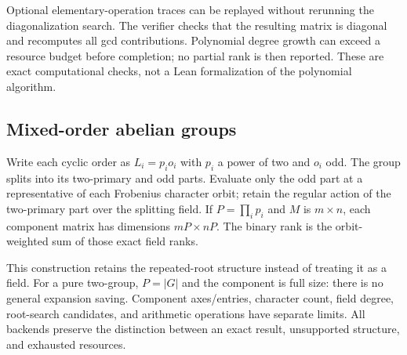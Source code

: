Optional elementary-operation traces can be replayed without rerunning
the diagonalization search. The verifier checks that the resulting
matrix is diagonal and recomputes all gcd contributions. Polynomial
degree growth can exceed a resource budget before completion; no partial
rank is then reported. These are exact computational checks, not a Lean
formalization of the polynomial algorithm.

\subsection{Mixed-order abelian groups}
Write each cyclic order as $L_i=p_i o_i$ with $p_i$ a power of two and
$o_i$ odd. The group splits into its two-primary and odd parts. Evaluate
only the odd part at a representative of each Frobenius character orbit;
retain the regular action of the two-primary part over the splitting
field. If $P=\prod_i p_i$ and $M$ is $m\times n$, each component matrix
has dimensions $mP\times nP$. The binary rank is the orbit-weighted sum
of those exact field ranks.

This construction retains the repeated-root structure instead of treating
it as a field. For a pure two-group, $P=|G|$ and the component is full size:
there is no general expansion saving. Component axes/entries, character
count, field degree, root-search candidates, and arithmetic operations
have separate limits. All backends preserve the distinction between an
exact result, unsupported structure, and exhausted resources.
